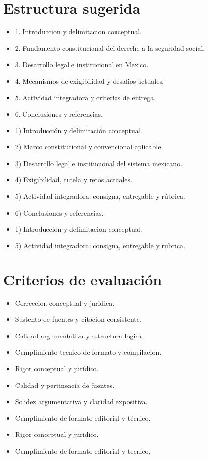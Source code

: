 \documentclass[12pt]{article}
\begin{document}
\section*{Estructura sugerida}
\begin{itemize}[leftmargin=*]
  \item 1. Introduccion y delimitacion conceptual.
  \item 2. Fundamento constitucional del derecho a la seguridad social.
  \item 3. Desarrollo legal e institucional en Mexico.
  \item 4. Mecanismos de exigibilidad y desafios actuales.
  \item 5. Actividad integradora y criterios de entrega.
  \item 6. Conclusiones y referencias.
  \item 1) Introducción y delimitación conceptual.
  \item 2) Marco constitucional y convencional aplicable.
  \item 3) Desarrollo legal e institucional del sistema mexicano.
  \item 4) Exigibilidad, tutela y retos actuales.
  \item 5) Actividad integradora: consigna, entregable y rúbrica.
  \item 6) Conclusiones y referencias.
  \item 1) Introduccion y delimitacion conceptual.
  \item 5) Actividad integradora: consigna, entregable y rubrica.
\end{itemize}

\section*{Criterios de evaluación}
\begin{itemize}[leftmargin=*]
  \item Correccion conceptual y juridica.
  \item Sustento de fuentes y citacion consistente.
  \item Calidad argumentativa y estructura logica.
  \item Cumplimiento tecnico de formato y compilacion.
  \item Rigor conceptual y jurídico.
  \item Calidad y pertinencia de fuentes.
  \item Solidez argumentativa y claridad expositiva.
  \item Cumplimiento de formato editorial y técnico.
  \item Rigor conceptual y juridico.
  \item Cumplimiento de formato editorial y tecnico.
\end{itemize}
\end{document}

